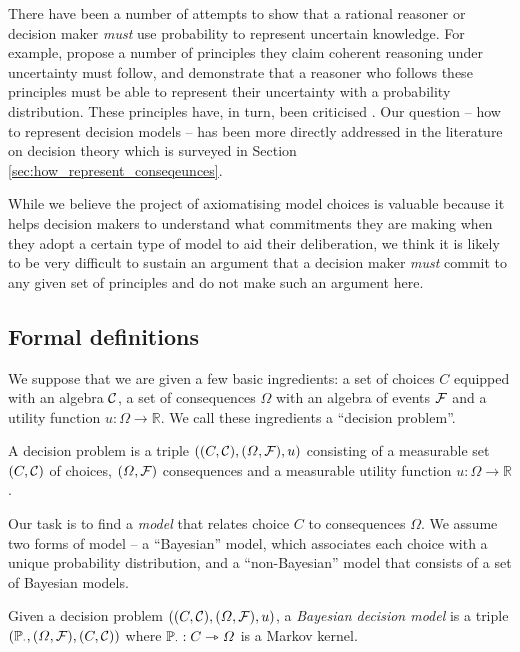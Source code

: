 There have been a number of attempts to show that a rational reasoner or decision maker \emph{must} use probability to represent uncertain knowledge. For example, \citet{de_finetti_foresight_1992,horvitz_framework_1986} propose a number of principles they claim coherent reasoning under uncertainty must follow, and demonstrate that a reasoner who follows these principles must be able to represent their uncertainty with a probability distribution. These principles have, in turn, been criticised \citep{halpern_counter_1999}. Our question -- how to represent decision models -- has been more directly addressed in the literature on decision theory which is surveyed in Section \ref{sec:how_represent_conseqeunces}. 

While we believe the project of axiomatising model choices is valuable because it helps decision makers to understand what commitments they are making when they adopt a certain type of model to aid their deliberation, we think it is likely to be very difficult to sustain an argument that a decision maker \emph{must} commit to any given set of principles and do not make such an argument here.

\subsection{Formal definitions}\label{sec:probability_set_models}

We suppose that we are given a few basic ingredients: a set of choices $C$ equipped with an algebra $\mathcal{C}$, a set of consequences $\Omega$ with an algebra of events $\mathcal{F}$ and a utility function $u:\Omega\to \mathbb{R}$. We call these ingredients a ``decision problem''.

\begin{definition}\label{def:dec_prob}
A decision problem is a triple $((C,\mathcal{C}),(\Omega,\mathcal{F}),u)$ consisting of a measurable set $(C,\mathcal{C})$ of choices, $(\Omega,\mathcal{F})$ consequences and a measurable utility function $u:\Omega\to \mathbb{R}$.
\end{definition}

Our task is to find a \emph{model} that relates choice $C$ to consequences $\Omega$. We assume two forms of model -- a ``Bayesian'' model, which associates each choice with a unique probability distribution, and a ``non-Bayesian'' model that consists of a set of Bayesian models.

\begin{definition}\label{def:ch_only}
Given a decision problem $((C,\mathcal{C}),(\Omega,\mathcal{F}),u)$, a \emph{Bayesian decision model} is a triple $(\mathbb{P}_\cdot,(\Omega,\mathcal{F}),(C,\mathcal{C}))$ where $\mathbb{P}_\cdot:C\rightarrowtriangle \Omega$ is a Markov kernel.
\end{definition}

